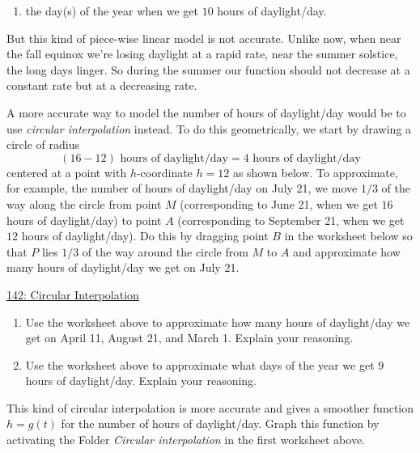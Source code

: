 \documentclass{ximera}
\begin{document}
\begin{example}
\begin{question}
\begin{enumerate}
\item the day(s) of the year when we get $10$ hours of daylight/day.
\end{enumerate}

But this kind of piece-wise linear model is not accurate. Unlike now, when near the fall equinox  we're losing daylight at a rapid rate, near the summer solstice, the long days linger. So during the summer our function should not decrease at a constant rate but at a decreasing rate.

A more accurate way to model the number of hours of daylight/day would be to use \emph{circular interpolation} instead. To do this geometrically, we start by drawing a circle of radius 
\[
     (16 - 12) \text{ hours of daylight/day} = 4 \text{ hours of daylight/day}
\]
centered at a point with $h$-coordinate $h=12$ as shown below. To approximate, for example, the number of hours of daylight/day on July 21, we move $1/3$ of the way along the circle from point $M$ (corresponding to June 21, when we get $16$ hours of daylight/day) to point $A$ (corresponding to September 21, when we get $12$ hours of daylight/day). Do this by dragging point $B$ in the worksheet below so that $P$ lies $1/3$ of the way around the circle from $M$ to $A$ and approximate how many hours of daylight/day we get on July 21.

 
\begin{onlineOnly}
    \begin{center}
\end{center}
\end{onlineOnly}

\href{https://www.desmos.com/calculator/nfsifbppzz}{142: Circular Interpolation}

\begin{enumerate}
\item Use the worksheet above to approximate how many hours of daylight/day we get on April 11, August 21, and March 1. Explain your reasoning.
\begin{freeResponse} 
\end{freeResponse}

\item Use the worksheet above to approximate what days of the year we get $9$ hours of daylight/day. Explain your reasoning.
\begin{freeResponse}
\end{freeResponse}
\end{enumerate}

This kind of circular interpolation is more accurate and gives a smoother function $h=g(t)$ for the number of hours of daylight/day. Graph this function by activating the Folder \emph{Circular interpolation} in the first worksheet above.



\end{question}


\end{example}
\end{document}
